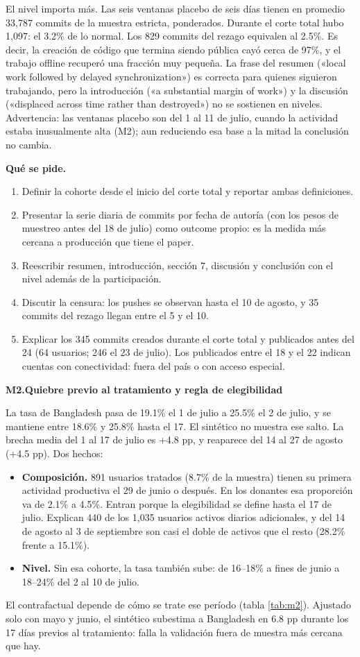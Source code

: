 \documentclass[11pt,a4paper]{article}
\newcommand{\coment}[2]{\medskip\noindent\textbf{#1.\enspace #2}\par\nopagebreak}
\newcommand{\pide}{\par\noindent\textbf{Qué se pide.}\enspace}
\begin{document}
El nivel importa más. Las seis ventanas placebo de seis días tienen en promedio 33,787 commits de la
muestra estricta, ponderados. Durante el corte total hubo 1,097: el 3.2\% de lo normal. Los 829
commits del rezago equivalen al 2.5\%. Es decir, la creación de código que termina siendo pública
cayó cerca de 97\%, y el trabajo offline recuperó una fracción muy pequeña. La frase del resumen
(«local work followed by delayed synchronization») es correcta para quienes siguieron trabajando,
pero la introducción («a substantial margin of work») y la discusión («displaced across time rather
than destroyed») no se sostienen en niveles. Advertencia: las ventanas placebo son del 1 al 11 de
julio, cuando la actividad estaba inusualmente alta (M2); aun reduciendo esa base a la mitad la
conclusión no cambia.
\pide
\begin{enumerate}
\item Definir la cohorte desde el inicio del corte total y reportar ambas definiciones.
\item Presentar la serie diaria de commits por fecha de autoría (con los pesos de muestreo antes del
18 de julio) como outcome propio: es la medida más cercana a producción que tiene el paper.
\item Reescribir resumen, introducción, sección 7, discusión y conclusión con el nivel además de la
participación.
\item Discutir la censura: los pushes se observan hasta el 10 de agosto, y 35 commits del rezago
llegan entre el 5 y el 10.
\item Explicar los 345 commits creados durante el corte total y publicados antes del 24 (64
usuarios; 246 el 23 de julio). Los publicados entre el 18 y el 22 indican cuentas con conectividad:
fuera del país o con acceso especial.
\end{enumerate}

\coment{M2}{Quiebre previo al tratamiento y regla de elegibilidad}
La tasa de Bangladesh pasa de 19.1\% el 1 de julio a 25.5\% el 2 de julio, y se mantiene entre 18.6\%
y 25.8\% hasta el 17. El sintético no muestra ese salto. La brecha media del 1 al 17 de julio es +4.8 pp, y
reaparece del 14 al 27 de agosto (+4.5 pp). Dos hechos:
\begin{itemize}
\item \textbf{Composición.} 891 usuarios tratados (8.7\% de la muestra) tienen su primera actividad
productiva el 29 de junio o después. En los donantes esa proporción va de 2.1\% a 4.5\%. Entran porque
la elegibilidad se define hasta el 17 de julio. Explican 440 de los 1,035 usuarios activos diarios
adicionales, y del 14 de agosto al 3 de septiembre son casi el doble de activos que el resto (28.2\% frente a
15.1\%).
\item \textbf{Nivel.} Sin esa cohorte, la tasa también sube: de 16–18\% a fines de junio a 18–24\% del
2 al 10 de julio.
\end{itemize}
El contrafactual depende de cómo se trate ese período (tabla \ref{tab:m2}). Ajustado solo con mayo y
junio, el sintético subestima a Bangladesh en 6.8 pp durante los 17 días previos al tratamiento: falla
la validación fuera de muestra más cercana que hay.
\end{document}
